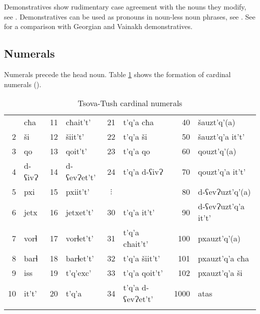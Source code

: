 Demonstratives show rudimentary case agreement with the nouns they modify, see . Demonstratives can be used as pronouns in noun-less noun phrases, see . See  for a comparison with Georgian and Vainakh demonstratives.


\subsection{Numerals} \label{numerals}
Numerals precede the head noun. Table \ref{tablenumerals} shows the formation of cardinal numerals (\cite{haukharris}).


\begin{table}
	\begin{tabular}{r@{~}l r@{~}l r@{~}l r@{~}l}
		\lsptoprule
		1 & cħa & 11 & cħait't'  & 21 & t'q'a cħa  & 40 & šauzt'q'(a) \\
		
		2 & ši & 12 & šiit't' & 22 & t'q'a ši & 50 & šauzt'q'a it't' \\
		
		3 & qo & 13 & qoit't' & 23 & t'q'a qo & 60 & qouzt'q'(a) \\
		
		4 & d-ʕivɁ & 14 & d-ʕevɁet't' & 24 & t'q'a  d-ʕivɁ & 70 & qouzt'q'a it't' \\ 
		
		5 & pxi & 15 & pxiit't' & \multicolumn{1}{c}{$\vdots$} & & 80 &  d-ʕevɁuzt'q'(a) \\
		
		6 & jetx & 16 & jetxet't' & 30 & t'q'a it't' & 90 & d-ʕevɁuzt'q'a it't' \\
		
		7 & vorɬ & 17 &  vorɬet't' & 31 & t'q'a cħait't' & 100 & pxauzt'q'(a) \\
		
		8 & barɬ & 18 &  barɬet't' & 32 & t'q'a šiit't' & 101 & pxauzt'q'a cħa \\
		
		9 & iss & 19 & t'q'exc' & 33 & t'q'a qoit't' & 102 & pxauzt'q'a ši \\
		
		10 & it't' & 20 & t'q'a  & 34 & t'q'a d-ʕevɁet't' & 1000 & atas \\
		\lspbottomrule
	\end{tabular}
	\caption{Tsova-Tush cardinal numerals}
	\label{tablenumerals}
\end{table}

